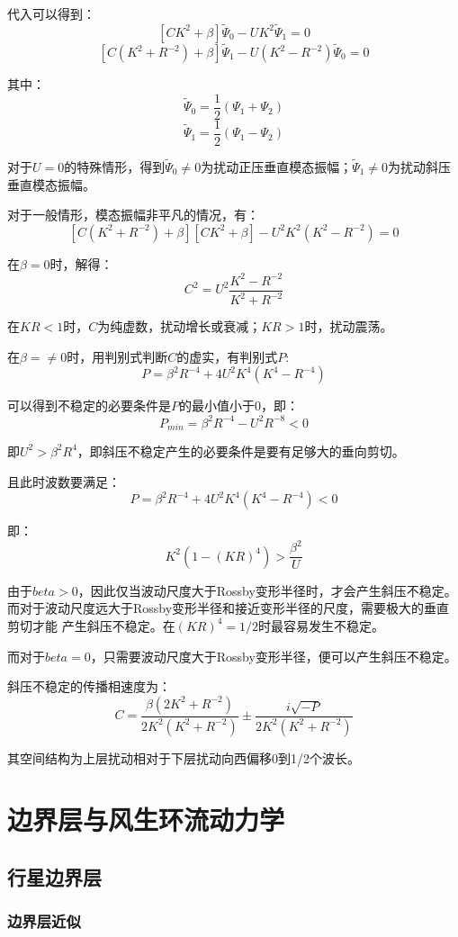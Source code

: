 \documentclass{article}
\begin{document}
代入可以得到：
$$[CK^2 +\beta]\tilde{\Psi}_0-UK^2\tilde{\Psi}_1 = 0$$
$$[C(K^2+R^{-2}) +\beta]\tilde{\Psi}_1-U(K^2-R^{-2})\tilde{\Psi}_0 = 0$$

其中：
$$\tilde{\Psi}_0 = \frac{1}{2}(\Psi_1 +\Psi_2)$$
$$\tilde{\Psi}_1 = \frac{1}{2}(\Psi_1 -\Psi_2)$$

对于$U=0$的特殊情形，得到$\tilde{\Psi}_0\ne0$为扰动正压垂直模态振幅；$\tilde{\Psi}_1\ne0$为扰动斜压垂直模态振幅。

对于一般情形，模态振幅非平凡的情况，有：
$$[C(K^2+R^{-2}) +\beta][CK^2 +\beta]-U^2K^2(K^2-R^{-2}) = 0$$

在$\beta=0$时，解得：
$$C^2 = U^2\frac{K^2-R^{-2}}{K^2+R^{-2}}$$

在$KR<1$时，$C$为纯虚数，扰动增长或衰减；$KR>1$时，扰动震荡。

在$\beta=\ne0$时，用判别式判断$C$的虚实，有判别式$P$:
$$P=\beta^2R^{-4}+4U^2K^4(K^4-R^{-4})$$

可以得到不稳定的必要条件是$P$的最小值小于$0$，即：
$$P_{min}=\beta^2R^{-4}-U^2R^{-8}<0$$

即$U^2 > \beta^2R^4$，即斜压不稳定产生的必要条件是要有足够大的垂向剪切。

且此时波数要满足：
$$P=\beta^2R^{-4}+4U^2K^4(K^4-R^{-4})<0$$

即：
$$K^2(1-(KR)^4) > \frac{\beta^2}{U}$$

由于$beta>0$，因此仅当波动尺度大于Rossby变形半径时，才会产生斜压不稳定。
而对于波动尺度远大于Rossby变形半径和接近变形半径的尺度，需要极大的垂直剪切才能
产生斜压不稳定。在$(KR)^4 = 1/2$时最容易发生不稳定。

而对于$beta = 0$，只需要波动尺度大于Rossby变形半径，便可以产生斜压不稳定。

斜压不稳定的传播相速度为：
$$C = \frac{\beta(2K^2+R^{-2})}{2K^2(K^2+R^{-2})}\pm\frac{i\sqrt{-P}}{2K^2(K^2+R^{-2})}$$

其空间结构为上层扰动相对于下层扰动向西偏移0到1/2个波长。

\newpage

\section{边界层与风生环流动力学}
\subsection{行星边界层}
\subsubsection{边界层近似}
\end{document}
